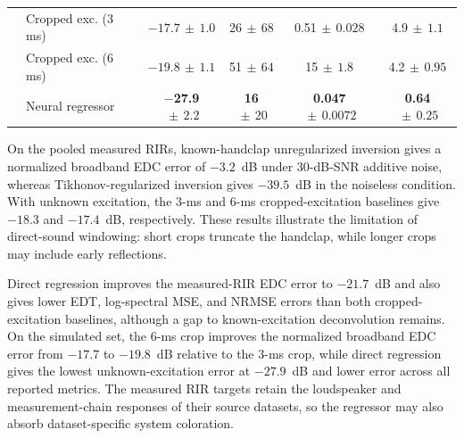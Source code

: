 \documentclass{article}
\begin{document}
\begin{table}[t]
{\begin{tabular}{@{}ll|cccc@{}}
& Cropped exc. (3 ms)
& $-17.7${\scriptsize$\,\pm\,1.0$}
& 26{\scriptsize$\,\pm\,68$}
& 0.51{\scriptsize$\,\pm\,0.028$}
& 4.9{\scriptsize$\,\pm\,1.1$} \\

& Cropped exc. (6 ms)
& $-19.8${\scriptsize$\,\pm\,1.1$}
& 51{\scriptsize$\,\pm\,64$}
& 15{\scriptsize$\,\pm\,1.8$}
& 4.2{\scriptsize$\,\pm\,0.95$} \\

& Neural regressor
& \textbf{$-$27.9}{\scriptsize$\,\pm\,2.2$}
& \textbf{16}{\scriptsize$\,\pm\,20$}
& \textbf{0.047}{\scriptsize$\,\pm\,0.0072$}
& \textbf{0.64}{\scriptsize$\,\pm\,0.25$} \\
\bottomrule
\end{tabular}%
}
\vspace{-0.3cm}
\end{table}




On the pooled measured RIRs, known-handclap unregularized inversion gives a
normalized broadband EDC error of $-3.2$~dB under 30-dB-SNR additive noise,
whereas Tikhonov-regularized inversion gives $-39.5$~dB in the noiseless
condition. With unknown excitation, the 3-ms and 6-ms cropped-excitation
baselines give $-18.3$ and $-17.4$~dB, respectively. These results illustrate
the limitation of direct-sound windowing: short crops truncate the handclap,
while longer crops may include early reflections.

Direct regression improves the measured-RIR EDC error to $-21.7$~dB and also
gives lower EDT, log-spectral MSE, and NRMSE errors than both
cropped-excitation baselines, although a gap to known-excitation deconvolution
remains. On the simulated set, the 6-ms crop improves the normalized
broadband EDC error from $-17.7$ to $-19.8$~dB relative to the 3-ms crop,
while direct regression gives the lowest unknown-excitation error at
$-27.9$~dB and lower error across all reported metrics. The measured RIR
targets retain the loudspeaker and measurement-chain responses of their source
datasets, so the regressor may also absorb dataset-specific system coloration.

\end{document}
